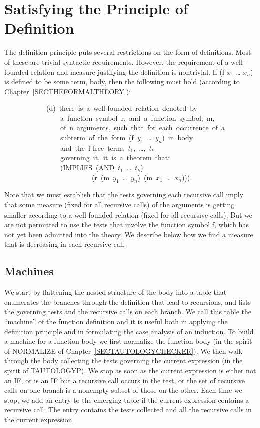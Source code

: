 \documentclass[10pt]{book}
\newenvironment{pubasis}{\begin{flushleft}}{\end{flushleft}}
\begin{document}
\section{Satisfying the Principle of Definition}
The definition principle puts several restrictions on the form of
definitions.  Most of these are trivial syntactic requirements.  However, the
requirement of a well-founded relation and measure justifying the definition
is nontrivial.  If (f $x_{1}$ \ldots{} $x_{n}$) is
defined to be some term, body, then the following must hold (according
to Chapter~\ref{SECTHEFORMALTHEORY}):
\begin{pubasis}
~~~~~~~~~~~~(d)~there~is~a~well-founded~relation~denoted~by\\
~~~~~~~~~~~~~~~~a~function~symbol~r,~and~a~function~symbol,~m,\\
~~~~~~~~~~~~~~~~of~n~arguments,~such~that~for~each~occurrence~of~a\\
~~~~~~~~~~~~~~~~subterm~of~the~form~(f~$y_{1}$~\ldots{}~$y_{n}$)~in~body\\
~~~~~~~~~~~~~~~~and~the~f-free~terms~$t_{1}$,~\ldots{},~$t_{k}$\\
~~~~~~~~~~~~~~~~governing~it,~it~is~a~theorem~that:\\

~~~~~~~~~~~~~~~~(IMPLIES~(AND~$t_{1}$~\ldots{}~$t_{k}$)\\
~~~~~~~~~~~~~~~~~~~~~~~~~(r~(m~$y_{1}$~\ldots{}~$y_{n}$)~(m~$x_{1}$~\ldots{}~$x_{n}$))).\\
\end{pubasis}
Note that we must establish that the tests governing each recursive
call imply that some measure (fixed for all recursive calls) of the
arguments is getting smaller according to a well-founded relation
(fixed for all recursive calls).  But we are not permitted to use the tests
that involve the function symbol f, which has not yet been admitted into
the theory.  We describe below how we find a measure that is decreasing
in each recursive call.

\subsection{Machines}
We start by flattening the
nested structure of the body into a table that enumerates the branches through the
definition that lead to recursions, and lists the  governing tests and the recursive calls on
each branch.
We call this table the ``machine'' of the function definition and it is useful both in
applying the definition principle and in formulating the case analysis of an induction.
To build a machine for a function body we first normalize the function
body (in the spirit of NORMALIZE of Chapter~\ref{SECTAUTOLOGYCHECKER}).  We then walk through the body collecting
the tests governing the current expression (in the spirit of TAUTOLOGYP).  We
stop as soon as the current expression
is
either not an IF, or is an IF but a recursive call occurs in the test, or
the set of recursive calls on one branch is a nonempty subset of
those on the other.  Each time we stop, we add an entry to the emerging table
if the current expression contains a recursive call.  The entry
contains the tests collected and all the recursive
calls in the current expression.
\end{document}
